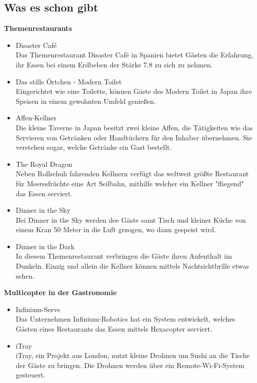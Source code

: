   \subsection{Was es schon gibt}
  \textbf{Themenrestaurants}
  \begin{itemize}
    \item Disaster Café\\
    Das Themenrestaurant Disaster Café in Spanien bietet Gästen die Erfahrung, ihr Essen bei einem Erdbeben
    der Stärke 7.8 zu sich zu nehmen.

    \item Das stille Örtchen - Modern Toilet\\
    Eingerichtet wie eine Toilette, können Gäste des Modern Toilet in Japan ihre Speisen in einem gewohnten Umfeld genießen.

    \item Affen-Kellner\\
    Die kleine Taverne in Japan besitzt zwei kleine Affen, die Tätigkeiten wie das Servieren von Getränken oder Handtüchern
    für den Inhaber übernehmen. Sie verstehen sogar, welche Getränke ein Gast bestellt.

    \item The Royal Dragon\\
    Neben Rollschuh fahrenden Kellnern verfügt das weltweit größte Restaurant für Meeresfrüchte eine
    Art Seilbahn, mithilfe welcher ein Kellner "fliegend" das Essen serviert.

    \item Dinner in the Sky\\
    Bei Dinner in the Sky werden dee Gäste samt Tisch und kleiner Küche von einem Kran 50 Meter
    in die Luft gezogen, wo dann gespeist wird.

    \item Dinner in the Dark\\
    In diesem Themenrestaurant verbringen die Gäste ihren Aufenthalt im Dunkeln. Einzig und allein die
    Kellner können mittels Nachtsichtbrille etwas sehen.
  \end{itemize}

  \textbf{Multicopter in der Gastronomie}
  \begin{itemize}
      \item{Infinium-Serve}\\
      Das Unternehmen Infinium-Robotics hat ein System entwickelt, welches Gästen eines Restaurants
      das Essen mittels Hexacopter serviert.

      \item{iTray}\\
      iTray, ein Projekt aus London, nutzt kleine Drohnen um Sushi an die Tische der Gäste zu bringen.
      Die Drohnen werden über ein Remote-Wi-Fi-System gesteuert.

  \end{itemize}

